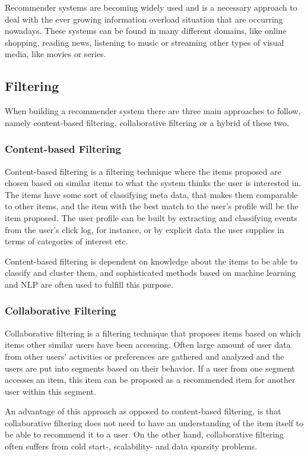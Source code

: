 Recommender systems are becoming widely used and is a necessary approach to deal with the ever growing information overload situation that are occurring nowadays. These systems can be found in many different domains, like online shopping, reading news, listening to music or streaming other types of visual media, like movies or series.

\subsection{Filtering}
When building a recommender system there are three main approaches to follow, namely content-based filtering, collaborative filtering or a hybrid of these two. 

\subsubsection{Content-based Filtering}
Content-based filtering is a filtering technique where the items proposed are chosen based on similar items to what the system thinks the user is interested in. The items have some sort of classifying meta data, that makes them comparable to other items, and the item with the best match to the user's profile will be the item proposed. The user profile can be built by extracting and classifying events from the user's click log, for instance, or by explicit data the user supplies in terms of categories of interest etc.

Content-based filtering is dependent on knowledge about the items to be able to classify and cluster them, and sophisticated methods based on machine learning and NLP are often used to fulfill this purpose. 


\subsubsection{Collaborative Filtering}
Collaborative filtering is a filtering technique that proposes items based on which items other similar users have been accessing. Often large amount of user data from other users' activities or preferences are gathered and analyzed and the users are put into segments based on their behavior. If a user from one segment accesses an item, this item can be proposed as a recommended item for another user within this segment.

An advantage of this approach as opposed to content-based filtering, is that collaborative filtering does not need to have an understanding of the item itself to be able to recommend it to a user. On the other hand, collaborative filtering often suffers from cold start\cite{lam2008addressing}-, scalability- and data sparsity\cite{huang2004applying} problems.

